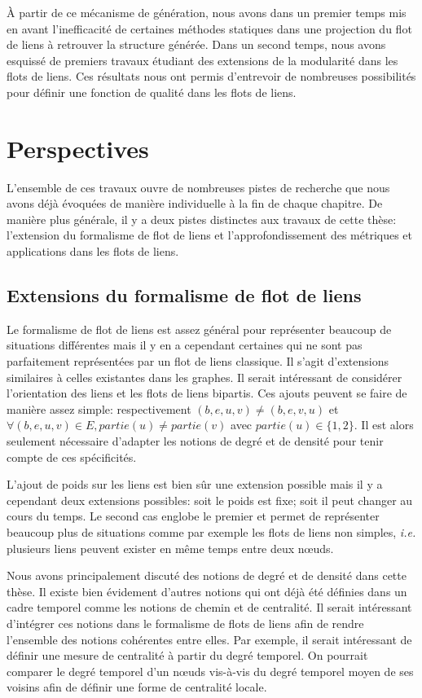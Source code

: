 \`A partir de ce mécanisme de génération, nous avons dans un premier temps mis en avant l'inefficacité de certaines méthodes statiques dans une projection du flot de liens à retrouver la structure générée.
Dans un second temps, nous avons esquissé de premiers travaux étudiant des extensions de la modularité dans les flots de liens.
Ces résultats nous ont permis d'entrevoir de nombreuses possibilités pour définir une fonction de qualité dans les flots de liens.

\section{Perspectives}

L'ensemble de ces travaux ouvre de nombreuses pistes de recherche que nous avons déjà évoquées de manière individuelle à la fin de chaque chapitre.
De manière plus générale, il y a deux pistes distinctes aux travaux de cette thèse: l'extension du formalisme de flot de liens et l'approfondissement des métriques et applications dans les flots de liens.

\subsection{Extensions du formalisme de flot de liens}

Le formalisme de flot de liens est assez général pour représenter beaucoup de situations différentes mais il y en a cependant certaines qui ne sont pas parfaitement représentées par un flot de liens classique.
Il s'agit d'extensions similaires à celles existantes dans les graphes.
Il serait intéressant de considérer l'orientation des liens et les flots de liens bipartis.
Ces ajouts peuvent se faire de manière assez simple: respectivement $(b,e,u,v)\neq (b,e,v,u)$ et $\forall (b,e,u,v) \in E, partie(u)\neq partie(v)$ avec $partie(u) \in \{1,2\}$.
Il est alors seulement nécessaire d'adapter les notions de degré et de densité pour tenir compte de ces spécificités.

L'ajout de poids sur les liens est bien sûr une extension possible mais il y a cependant deux extensions possibles: soit le poids est fixe; soit il peut changer au cours du temps.
Le second cas englobe le premier et permet de représenter beaucoup plus de situations comme par exemple les flots de liens non simples, \emph{i.e.} plusieurs liens peuvent exister en même temps entre deux n\oe{}uds.

Nous avons principalement discuté des notions de degré et de densité dans cette thèse.
Il existe bien évidement d'autres notions qui ont déjà été définies dans un cadre temporel comme les notions de chemin et de centralité.
Il serait intéressant d'intégrer ces notions dans le formalisme de flots de liens afin de rendre l'ensemble des notions cohérentes entre elles.
Par exemple, il serait intéressant de définir une mesure de centralité à partir du degré temporel.
On pourrait comparer le degré temporel d'un n\oe{}uds vis-à-vis du degré temporel moyen de ses voisins afin de définir une forme de centralité locale.

